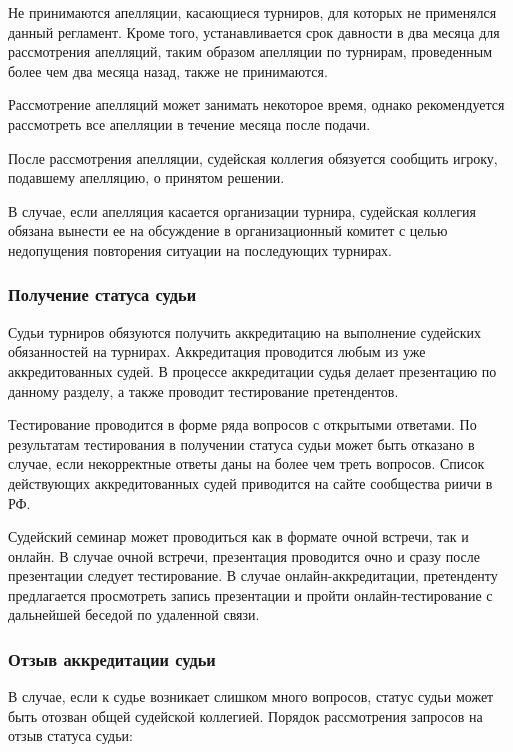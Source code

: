 Не принимаются апелляции, касающиеся турниров, для которых не применялся данный регламент. Кроме того, устанавливается срок давности в два месяца для рассмотрения апелляций, таким образом апелляции по турнирам, проведенным более чем два месяца назад, также не принимаются.

Рассмотрение апелляций может занимать некоторое время, однако рекомендуется рассмотреть все апелляции в течение месяца после подачи. 

После рассмотрения апелляции, судейская коллегия обязуется сообщить игроку, подавшему апелляцию, о принятом решении.

В случае, если апелляция касается организации турнира, судейская коллегия обязана вынести ее на обсуждение в организационный комитет с целью недопущения повторения ситуации на последующих турнирах.

\subsubsection{Получение статуса судьи}

Судьи турниров обязуются получить аккредитацию на выполнение судейских обязанностей на турнирах. Аккредитация проводится любым из уже аккредитованных судей. В процессе аккредитации судья делает презентацию по данному разделу, а также проводит тестирование претендентов.

Тестирование проводится в форме ряда вопросов с открытыми ответами. По результатам тестирования в получении статуса судьи может быть отказано в случае, если некорректные ответы даны на более чем треть вопросов. Список действующих аккредитованных судей приводится на сайте сообщества риичи в РФ.

Судейский семинар может проводиться как в формате очной встречи, так и онлайн. В случае очной встречи, презентация проводится очно и сразу после презентации следует тестирование. В случае онлайн-аккредитации, претенденту предлагается просмотреть запись презентации и пройти онлайн-тестирование с дальнейшей беседой по удаленной связи. 

\subsubsection{Отзыв аккредитации судьи}

В случае, если к судье возникает слишком много вопросов, статус судьи может быть отозван общей судейской коллегией. Порядок рассмотрения запросов на отзыв статуса судьи:

